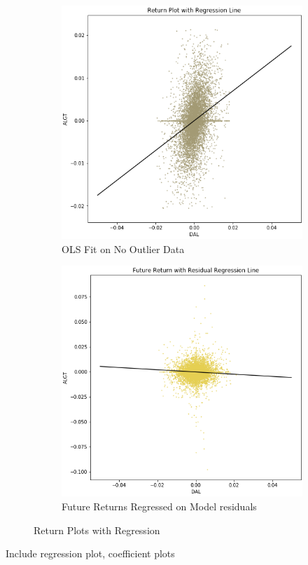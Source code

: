 \documentclass{article}
\begin{document}
\begin{figure}[h!]
  \centering
  \begin{subfigure}{.5\textwidth}
    \centering
    \includegraphics[width=.95\linewidth]{../Figures/return_plot_wReg.png}
    \caption{OLS Fit on No Outlier Data}
  \end{subfigure}%
  \begin{subfigure}{.5\textwidth}
    \centering
    \includegraphics[width=.95\linewidth]{../Figures/return_plot_wResidReg.png}
    \caption{Future Returns Regressed on Model residuals}
  \end{subfigure}
  \caption{Return Plots with Regression}
\end{figure}
Include regression plot, coefficient plots
\end{document}
